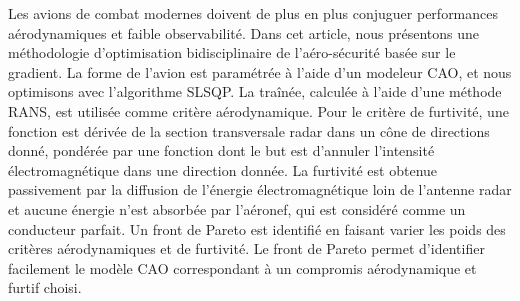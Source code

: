 \begin{resume}
    Les avions de combat modernes doivent de plus en plus conjuguer performances aérodynamiques et faible observabilité.
	Dans cet article, nous présentons une méthodologie d'optimisation bidisciplinaire de l'aéro-sécurité basée sur le gradient.
	La forme de l'avion est paramétrée à l'aide d'un modeleur CAO, et nous optimisons avec l'algorithme SLSQP. La traînée, calculée à l'aide d'une méthode RANS, est utilisée comme critère aérodynamique.
	Pour le critère de furtivité, une fonction est dérivée de la section transversale radar dans un cône de directions donné, pondérée par une fonction dont le but est d'annuler l'intensité électromagnétique dans une direction donnée.
	La furtivité est obtenue passivement par la diffusion de l'énergie électromagnétique loin de l'antenne radar et aucune énergie n'est absorbée par l'aéronef, qui est considéré comme un conducteur parfait. Un front de Pareto est identifié en faisant varier les poids des critères aérodynamiques et de furtivité. Le front de Pareto permet d'identifier facilement le modèle CAO correspondant à un compromis aérodynamique et furtif choisi.
\end{resume}
